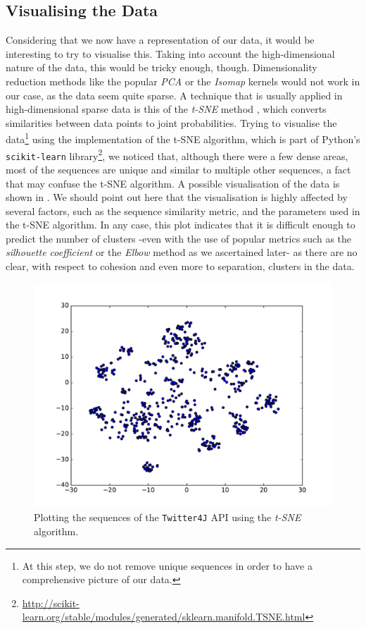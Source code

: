 \subsection{Visualising the Data}
\label{subsec:data-visualisation}

Considering that we now have a representation of our data, it would be interesting to try to visualise this. Taking into account the high-dimensional nature of the data, this would be tricky enough, though. Dimensionality reduction methods like the popular \textit{PCA} or the \textit{Isomap} kernels would not work in our case, as the data seem quite sparse. A technique that is usually applied in high-dimensional sparse data is this of the \textit{t-SNE} method \cite{Maaten:2008}, which converts similarities between data points to joint probabilities. Trying to visualise the data\footnote{At this step, we do not remove unique sequences in order to have a comprehensive picture of our data.} using the implementation of the t-SNE algorithm, which is part of Python's \texttt{scikit-learn} library\footnote{\url{http://scikit-learn.org/stable/modules/generated/sklearn.manifold.TSNE.html}}, we noticed that, although there were a few dense areas, most of the sequences are unique and similar to multiple other sequences, a fact that may confuse the t-SNE algorithm. A possible visualisation of the data is shown in . We should point out here that the visualisation is highly affected by several factors, such as the sequence similarity metric, and the parameters used in the t-SNE algorithm. In any case, this plot indicates that it is difficult enough to predict the number of clusters -even with the use of popular metrics such as the \textit{silhouette coefficient} or the \textit{Elbow} method as we ascertained later- as there are no clear, with respect to cohesion and even more to separation, clusters in the data.

\begin{figure}[h]
  \centering
  \includegraphics[scale=0.4]{images/tsne-plot}
  \caption[Plotting the data using the \textit{t-SNE} technique]{Plotting the sequences of the \texttt{Twitter4J} API using the \textit{t-SNE} algorithm.}
  \label{images:tsne-plot}
\end{figure}


